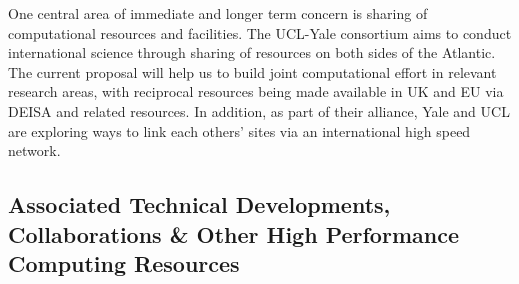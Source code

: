 One central area of immediate and longer term concern is sharing of
computational resources and facilities. The UCL-Yale consortium aims
to conduct international science through sharing of resources on both
sides of the Atlantic. The current proposal will help us to build
joint computational effort in relevant research areas, with reciprocal
resources being made available in UK and EU via DEISA and related
resources. In addition, as part of their alliance, Yale and UCL are
exploring ways to link each others' sites via an international high
speed network.

\begin{comment}
Yale \& UCL are planning to link each others' sites via an
international high speed network in 2010, funding for which will come
from the two institutions, UK Government and EU (as part of the ELIXIR
project which will develop sustainable data infrastructures across
Europe). JA.NET (the UK's education and research network,
http://www.ja.net) will provide the 10Gb/s dedicated connectivity via
their LightPath (http://www.ja.net/services/lightpath) link
procurements to DANTE (DANTE Delivery of Advanced Network Technology
to Europe; http://www.dante.net), crossing under the Atlantic to
Internet2 and hence on to Yale \& TeraGrid.
\end{comment}

\subsection{Associated Technical Developments, Collaborations \& Other High
Performance Computing Resources}

